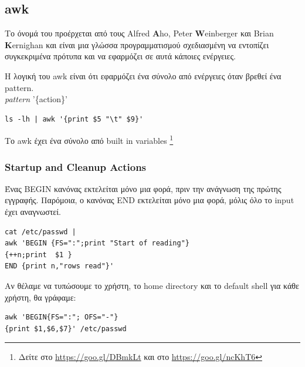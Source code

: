 \subsection{awk}

Το όνομά του προέρχεται από τους Alfred \textbf{A}ho, Peter \textbf{W}einberger και Brian \textbf{K}ernighan και είναι μια γλώσσα προγραμματισμού σχεδιασμένη να εντοπίζει συγκεκριμένα πρότυπα και να εφαρμόζει σε αυτά κάποιες ενέργειες.  

Η λογική του awk είναι ότι εφαρμόζει ένα σύνολο από ενέργειες όταν βρεθεί ένα pattern.\\
\textit{pattern} '\{action\}' \\
\begin{lstlisting}
ls -lh | awk '{print $5 "\t" $9}'
\end{lstlisting}

Το awk έχει ένα σύνολο από built in variables \footnote{Δείτε στο \href{https://goo.gl/DBmkLt}{https://goo.gl/DBmkLt} και στο \href{https://goo.gl/ncKhT6}{https://goo.gl/ncKhT6}}

\subsubsection{Startup and Cleanup Actions}
Ένας BEGIN κανόνας εκτελείται μόνο μια φορά, πριν την ανάγνωση της πρώτης εγγραφής. Παρόμοια, ο κανόνας END εκτελείται μόνο μια φορά, μόλις όλο το input έχει αναγνωστεί.

\begin{lstlisting}
cat /etc/passwd |
awk 'BEGIN {FS=":";print "Start of reading"}
{++n;print  $1 }
END {print n,"rows read"}'
\end{lstlisting}

Αν θέλαμε να τυπώσουμε το χρήστη, το home directory και το default shell για κάθε χρήστη, θα γράφαμε:

\begin{lstlisting}
awk 'BEGIN{FS=":"; OFS="-"} 
{print $1,$6,$7}' /etc/passwd
\end{lstlisting}


